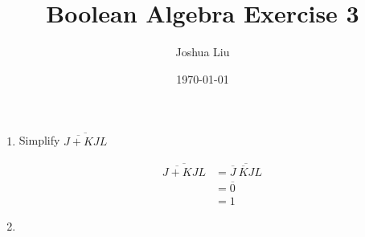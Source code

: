 \documentclass[12pt]{article}
\title{Boolean Algebra Exercise 3}
\author{Joshua Liu}
\date{\today}
\begin{document}
\let\not\overline
\maketitle
\begin{enumerate}
    \item Simplify $\not{\not{J+K}JL}$

    \begin{align*}
        \not{\not{J+K}JL}&=\not{\not J\ \not KJL}\\
        &=\not 0\\
        &=1
    \end{align*}
    \item 
\end{enumerate}
    
\end{document}
